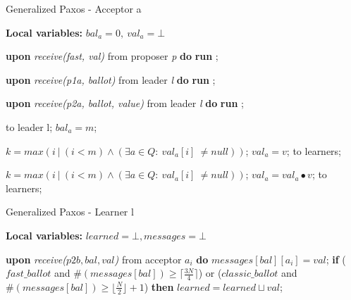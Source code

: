 \documentclass[runningheads,a4paper]{llncs}
\begin{document}
\begin{algorithm}
	\caption{Generalized Paxos - Acceptor a}
	\label{alg:acceptor}
	\textbf{Local variables: } $bal_a = 0,\ val_a = \bot$ 
	\begin{algorithmic}[1]
		
		\State \textbf{upon} \textit{receive(fast, val)} from proposer \textit{p} \textbf{do}
		\State \hspace{\algorithmicindent} \textbf{run} ;
		
		\State
		\State \textbf{upon} \textit{receive(p1a, ballot)} from leader \textit{l} \textbf{do}
		\State \hspace{\algorithmicindent} \textbf{run} ;
		
		\State
		\State \textbf{upon} \textit{receive(p2a, ballot, value)} from leader \textit{l} \textbf{do}
		\State \hspace{\algorithmicindent} \textbf{run} ;
		
		\State
		\State {} to leader l;
		\State $bal_a = m$;
		\EndIf
		\EndFunction
		
		\State
		\State $k = max(i\ |\ (i < m) \wedge (\exists a \in Q :\ val_a[i]\ \neq null))$;
		\State $val_a = v$;
		\State {} to learners;
		\EndIf
		\EndFunction
		
		\State
		\State $k = max(i\ |\ (i < m) \wedge (\exists a \in Q :\ val_a[i]\ \neq null))$;
		\State $val_a = val_a \bullet v$;
		\State {} to learners;
		\EndIf
		\EndFunction
		
	\end{algorithmic}
\end{algorithm}

\begin{algorithm}
	\caption{Generalized Paxos - Learner l}
	\label{alg:learner}
	\textbf{Local variables: } $learned = \bot, messages = \bot$ 
	\begin{algorithmic}[1]
		\State \textbf{upon} \textit{receive($p2b, bal, val$)} from acceptor $a_i$ \textbf{do}
		\State \hspace{\algorithmicindent} $messages[bal][a_i] = val$;
		\State \hspace{\algorithmicindent} \textbf{if} {($fast\_ballot$ and $\#(messages[bal]) \geq \lceil \frac{3N}{4} \rceil$) or
			\State \hspace{\algorithmicindent} \hspace{\algorithmicindent}	($classic\_ballot$ and $\#(messages[bal]) \geq \lfloor \frac{N}{2}\rfloor+1$)} \textbf{then}
		\State \hspace{\algorithmicindent} \hspace{\algorithmicindent} \hspace{\algorithmicindent} $learned = learned \sqcup val$;
	\end{algorithmic}
\end{algorithm}
\newpage
\end{document}
